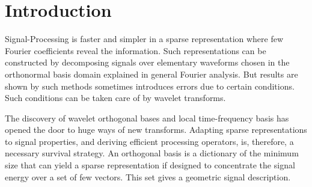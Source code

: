 \newpage
\section{Introduction \label{sec:intro}}

Signal-Processing is faster and simpler in a sparse representation where few Fourier coefficients reveal the information. Such representations can be constructed by decomposing signals over elementary waveforms chosen in the orthonormal basis domain explained in general Fourier analysis. But results are shown by such methods sometimes introduces errors due to certain conditions. Such conditions can be taken care of by wavelet transforms. 


The discovery of wavelet orthogonal bases and local time-frequency basis has opened the door to huge ways of new transforms. Adapting sparse representations to signal properties, and deriving efficient processing operators, is, therefore, a necessary survival strategy. An orthogonal basis is a dictionary of the minimum size that can yield a sparse representation if designed to concentrate the signal energy over a set of few vectors. This set gives a geometric signal description.